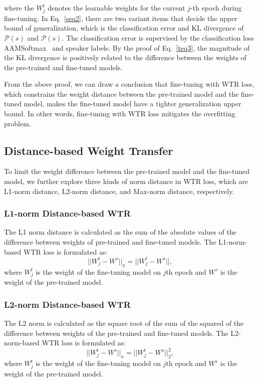 \documentclass{article}
\begin{document}
\noindent where the $W^t_j$ denotes the learnable weights for the current $j$-th epoch during fine-tuning. In Eq.~\ref{seq2}, there are two variant items that decide the upper bound of generalization, which is the classification error and KL divergence of $\mathcal{P}(s)$ and $\mathcal{P}(s)$. The classification error is supervised by the classification loss AAMSoftmax~\cite{deng2019arcface} and speaker labels. By the proof of Eq.~\ref{teq3}, the magnitude of the KL divergence is positively related to the difference between the weights of the pre-trained and fine-tuned models. 

From the above proof, we can draw a conclusion that fine-tuning with WTR loss, which constrains the weight distance between the pre-trained model and the fine-tuned model, makes the fine-tuned model have a tighter generalization upper bound. In other words, fine-tuning with WTR loss mitigates the overfitting problem.

\subsection{Distance-based Weight Transfer}
To limit the weight difference between the pre-trained model and the fine-tuned model, we further explore three kinds of norm distance in WTR loss, which are L1-norm distance, L2-norm distance, and Max-norm distance, respectively.

\subsubsection{L1-norm Distance-based WTR}
The L1 norm distance is calculated as the sum of the absolute values of the difference between weights of pre-trained and fine-tuned models. 
The L1-norm-based WTR loss is formulated as:
\begin{equation}
||W_j^t - W^s ||_\pi = ||W_j^t - W^s||,
\label{l1norm}
\end{equation}
 where $W_j^t$ is the weight of the fine-tuning model on $j$\-th epoch and $W^s$ is the weight of the pre-trained model. 

\subsubsection{L2-norm Distance-based WTR}
The L2 norm is calculated as the square root of the sum of the squared of the difference between weights of the pre-trained and fine-tuned models. The L2-norm-based WTR loss is formulated as:
\begin{equation}
||W_j^t - W^s ||_\pi = ||W_j^t - W^s||_2^2,
\label{l2norm}
\end{equation}
 where $W_j^t$ is the weight of the fine-tuning model on $j$\-th epoch and $W^s$ is the weight of the pre-trained model. 
\end{document}
